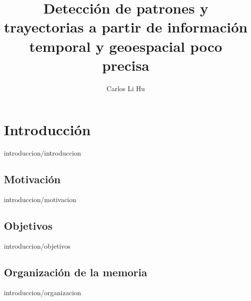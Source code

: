 \documentclass[epsbased,copyright,final,printable,covers,extendedindex,firstnumbered,tfg,gnuplot]{tfgtfmthesisuam}
\title{Detección de patrones y trayectorias a partir de información temporal y geoespacial poco precisa}
\author{Carlos Li Hu}
\begin{document}
\chapter{Introducción\label{CAP:INTRODUCCION}}{introduccion/introduccion}
  \section{Motivación\label{SEC:MOTIVACION}}{introduccion/motivacion}
  \section{Objetivos\label{SEC:OBJETIVOS}}{introduccion/objetivos}
  \section{Organización de la memoria\label{SEC:ORGANIZACION}}{introduccion/organizacion}
\end{document}
